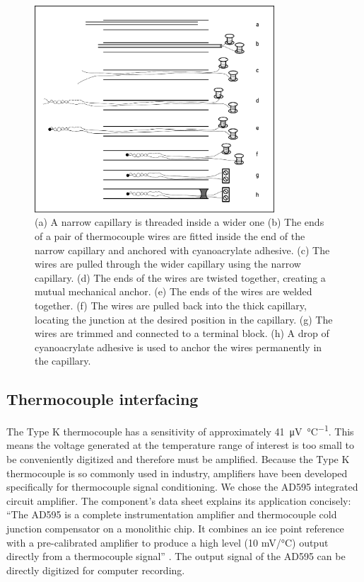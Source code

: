 \begin{figure}
	\centering
	\includegraphics[width=0.8\textwidth]{Figures/FineWireThermocouple.pdf}
	\decoRule
	
\caption[A cartoon explaining how to construct a long, thin thermocouple
probe.]{(a) A narrow capillary is threaded inside a wider one (b) The ends of a
pair of thermocouple wires are fitted inside the end of the narrow capillary and
anchored with cyanoacrylate adhesive. (c) The wires are pulled through the
wider capillary using the narrow capillary. (d) The ends of the wires are twisted
together, creating a mutual mechanical anchor.
(e) The ends of the wires are welded together. (f) The wires are pulled back
into the thick capillary, locating the junction at the desired position in the
capillary. (g) The wires are trimmed and connected to a terminal block. (h) A
drop of cyanoacrylate adhesive is used to anchor the wires permanently in the
capillary. }
	
	\label{fig:FineWireThermocouple}
\end{figure}

\subsection{Thermocouple interfacing}

The Type K thermocouple has a sensitivity of approximately
\SI{41}{\micro\volt\per\celsius}. This means the voltage generated at the
temperature range of interest is too small to be conveniently digitized and
therefore must be amplified. Because the Type K thermocouple is so commonly used
in industry, amplifiers have been developed specifically for thermocouple signal
conditioning. We chose the AD595 integrated circuit amplifier. The component's
data sheet explains its application concisely: ``The AD595 is a complete
instrumentation amplifier and thermocouple cold junction compensator on a
monolithic chip. It combines an ice point reference with a pre-calibrated
amplifier to produce a high level (10 mV/°C) output directly from a thermocouple
signal'' \autocite{AD595}. The output signal of the AD595 can be directly
digitized for computer recording.

